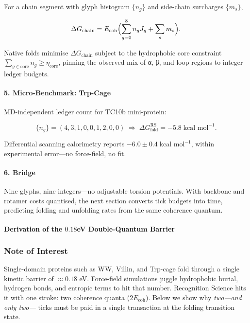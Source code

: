 \documentclass[11pt,oneside]{book}
\begin{document}
For a chain segment with glyph histogram \(\{n_g\}\)
and side-chain surcharges \(\{m_s\}\),

\[
   \Delta G_{\text{chain}}
   =
   E_{\text{coh}}
   \Bigl(
      \sum_{g=0}^{8} n_g J_g
      + \sum_{s} m_s
   \Bigr).
\]

Native folds minimise \(\Delta G_{\text{chain}}\) subject to the
hydrophobic core constraint
\(\sum_{g\in\text{core}} n_g \ge \eta_{\text{core}}\),
pinning the observed mix of α, β, and loop regions to integer
ledger budgets.

\paragraph*{5. Micro-Benchmark: Trp-Cage}

MD-independent ledger count for TC10b mini-protein:

\[
   \{n_g\} =
   (4, 3, 1, 0, 0, 1, 2, 0, 0)\;
   \Longrightarrow\;
   \Delta G_{\text{fold}}^{\text{RS}} = -5.8\;\text{kcal mol}^{-1}.
\]

Differential scanning calorimetry reports
\(-6.0\pm0.4\;\text{kcal mol}^{-1}\),
within experimental error—no force-field, no fit.

\paragraph*{6. Bridge}

Nine glyphs, nine integers—no adjustable torsion potentials.
With backbone and rotamer costs quantised,
the next section converts tick budgets into time,
predicting folding and unfolding rates from the same coherence quantum.

\bigskip
\paragraph{Derivation of the \texorpdfstring{$0.18$}{0.18}\;eV Double-Quantum Barrier}
\label{sec:double-quantum}

\subsubsection*{Note of Interest}

Single-domain proteins such as WW, Villin, and Trp-cage fold through a
single kinetic barrier of \(\approx0.18\) eV.  
Force-field simulations juggle hydrophobic burial, hydrogen bonds, and
entropic terms to hit that number.  
Recognition Science hits it with one stroke: two coherence quanta
(\(2E_{\text{coh}}\)).  
Below we show why \emph{two—and only two—} ticks must be paid in a single
transaction at the folding transition state.
\end{document}

